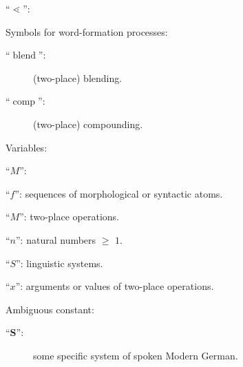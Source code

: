 \documentclass[output=paper
  ,nobabel
  ,draftmode
  ,colorlinks, citecolor=brown
]{langscibook}
\begin{document}
\begin{labeledlist}{``$⋖$'':}
\end{labeledlist} Symbols for word-formation processes: \begin{description}
\item[``$\operatorname{blend}$'':] (two-place) blending.
\item[``$\operatorname{comp}$'':] (two-place) compounding.
\end{description} Variables: \begin{labeledlist}{``$M$'':}
\item[``$f$'':] sequences of morphological or syntactic atoms.
\item[``$M$'':] two-place operations.
\item[``$n$'':] natural numbers $≥$ $1$.
\item[``$S$'':] linguistic systems.
\item[``$x$'':] arguments or values of two-place operations.
\end{labeledlist} Ambiguous constant: \begin{description}
\item[``$\mathbf{S}$'':] some specific system of spoken Modern German.
\end{description}


{\sloppy
\printbibliography[heading=subbibliography,notkeyword=source]
\newrefcontext[labelprefix=S]
\printbibliography[heading=subbibliography,keyword=source,env=sources,title={List of sources}]
}
\end{document}
